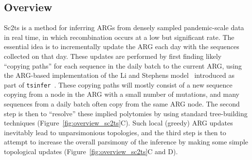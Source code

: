 \documentclass{article}
\begin{document}
\subsection{Overview}
Sc2ts is a method for inferring ARGs from densely sampled pandemic-scale data
in real time, in which recombination occurs at a low but significant rate.
The essential idea is to incrementally update the ARG each day
with the sequences collected on that day. These updates are performed by
first finding likely ``copying paths'' for each sequence in the daily
batch to the current ARG, using the ARG-based implementation of
the Li and Stephens model~\citep{Li2003-ib} introduced as
part of \texttt{tsinfer}~\citep{Kelleher2019-ba}. These copying paths
will mostly consist of a new sequence copying from a node in the ARG
with a small number of mutations, and many sequences
from a daily batch often copy from the same ARG node. The second
step is then to ``resolve'' these implied polytomies by using
standard tree-building techniques (Figure~\ref{fig:overview_sc2ts}C).
Such local (greedy) ARG updates inevitably lead to unparsimonious
topologies, and the third step is then to attempt to increase the
overall parsimony of the inference by making some simple topological
updates (Figure~\ref{fig:overview_sc2ts}C and D).
\end{document}
